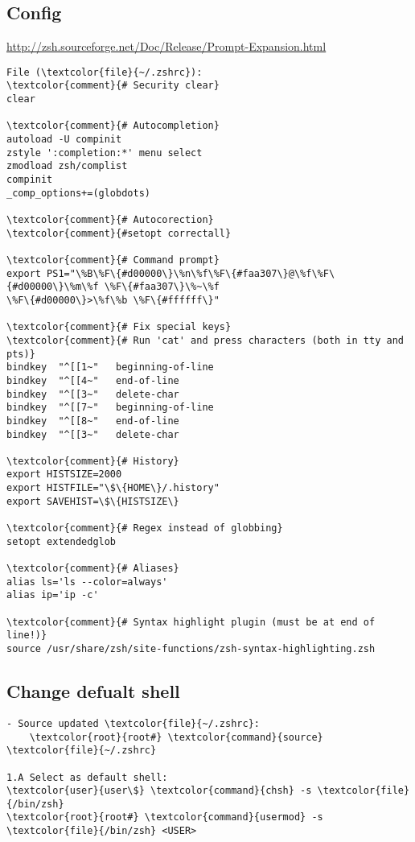 \documentclass[10pt, a4paper, onecolumn, openany]{book}         %
\begin{document}
\subsection{Config}
\underline{\url{http://zsh.sourceforge.net/Doc/Release/Prompt-Expansion.html}}\newline
\begin{Verbatim}[commandchars=\\\{\}]
File (\textcolor{file}{~/.zshrc}):
\textcolor{comment}{# Security clear}
clear

\textcolor{comment}{# Autocompletion}
autoload -U compinit 
zstyle ':completion:*' menu select
zmodload zsh/complist
compinit
_comp_options+=(globdots)

\textcolor{comment}{# Autocorection}
\textcolor{comment}{#setopt correctall}

\textcolor{comment}{# Command prompt}
export PS1="\%B\%F\{#d00000\}\%n\%f\%F\{#faa307\}@\%f\%F\{#d00000\}\%m\%f \%F\{#faa307\}\%~\%f
\%F\{#d00000\}>\%f\%b \%F\{#ffffff\}" 

\textcolor{comment}{# Fix special keys}
\textcolor{comment}{# Run 'cat' and press characters (both in tty and pts)}
bindkey  "^[[1~"   beginning-of-line
bindkey  "^[[4~"   end-of-line
bindkey  "^[[3~"   delete-char
bindkey  "^[[7~"   beginning-of-line
bindkey  "^[[8~"   end-of-line
bindkey  "^[[3~"   delete-char

\textcolor{comment}{# History}
export HISTSIZE=2000
export HISTFILE="\$\{HOME\}/.history" 
export SAVEHIST=\$\{HISTSIZE\}

\textcolor{comment}{# Regex instead of globbing}
setopt extendedglob

\textcolor{comment}{# Aliases}
alias ls='ls --color=always'
alias ip='ip -c'

\textcolor{comment}{# Syntax highlight plugin (must be at end of line!)}
source /usr/share/zsh/site-functions/zsh-syntax-highlighting.zsh
\end{Verbatim}

\subsection{Change defualt shell}
\begin{Verbatim}[commandchars=\\\{\}]
- Source updated \textcolor{file}{~/.zshrc}:
    \textcolor{root}{root#} \textcolor{command}{source} \textcolor{file}{~/.zshrc}
    
1.A Select as default shell:
\textcolor{user}{user\$} \textcolor{command}{chsh} -s \textcolor{file}{/bin/zsh}
\textcolor{root}{root#} \textcolor{command}{usermod} -s \textcolor{file}{/bin/zsh} <USER>
\end{Verbatim}
\end{document}
